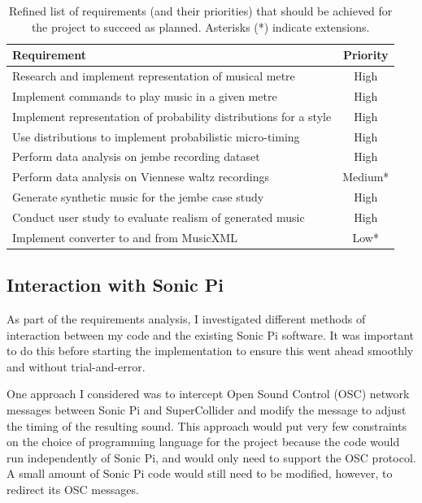 \documentclass[12pt,twoside,openright]{report}
\begin{document}
\begin{table}[ht]
\centering
\begin{tabularx}{400pt}{Xc}
    \toprule
    \textbf{Requirement}                                      & \textbf{Priority} \\
    \midrule
    Research and implement representation of musical metre              & High \\
    Implement commands to play music in a given metre                   & High \\
    Implement representation of probability distributions for a style   & High \\
    Use distributions to implement probabilistic micro-timing           & High \\
    Perform data analysis on jembe recording dataset                    & High \\
    Perform data analysis on Viennese waltz recordings                  & Medium* \\
    Generate synthetic music for the jembe case study                   & High \\
    Conduct user study to evaluate realism of generated music           & High \\
    Implement converter to and from MusicXML                            & Low* \\
    \bottomrule
\end{tabularx}
\caption{Refined list of requirements (and their priorities) that should be achieved for the project to succeed as planned. Asterisks (*) indicate extensions.}
\label{table:requirements}
\end{table}


\subsection{Interaction with Sonic Pi}

As part of the requirements analysis, I investigated different methods of
interaction between my code and the existing Sonic Pi software. It was important
to do this before starting the implementation to ensure this went ahead smoothly
and without trial-and-error.

One approach I considered was to intercept Open Sound Control (OSC) network
messages between Sonic Pi and SuperCollider and modify the message to adjust the timing of the resulting sound. This approach would put very few constraints on the choice of programming language for the project because the code would run independently of Sonic Pi, and would only need to support the OSC protocol. A small amount of Sonic Pi code would still need to be modified, however, to redirect its OSC messages.
\end{document}
